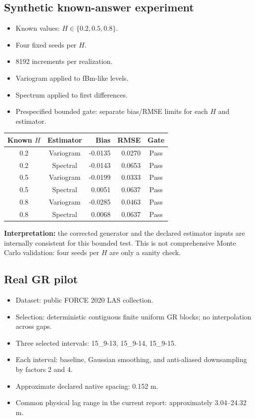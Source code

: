 \documentclass[11pt,a4paper]{article}
\begin{document}
\subsection{Synthetic known-answer experiment}
\begin{itemize}
\item Known values: $H\in\{0.2,0.5,0.8\}$.
\item Four fixed seeds per $H$.
\item 8192 increments per realization.
\item Variogram applied to fBm-like levels.
\item Spectrum applied to first differences.
\item Prespecified bounded gate: separate bias/RMSE limits for each $H$ and estimator.
\end{itemize}

\begin{center}
\begin{tabular}{@{}ccrrc@{}}
\toprule
Known $H$ & Estimator & Bias & RMSE & Gate\\
\midrule
0.2 & Variogram & -0.0135 & 0.0270 & Pass\\
0.2 & Spectral & -0.0143 & 0.0653 & Pass\\
0.5 & Variogram & -0.0199 & 0.0333 & Pass\\
0.5 & Spectral & 0.0051 & 0.0637 & Pass\\
0.8 & Variogram & -0.0285 & 0.0463 & Pass\\
0.8 & Spectral & 0.0068 & 0.0637 & Pass\\
\bottomrule
\end{tabular}
\end{center}

\textbf{Interpretation:} the corrected generator and the declared estimator inputs are internally consistent for this bounded test. This is not comprehensive Monte Carlo validation: four seeds per $H$ are only a sanity check.

\subsection{Real GR pilot}
\begin{itemize}
\item Dataset: public FORCE 2020 LAS collection.
\item Selection: deterministic contiguous finite uniform GR blocks; no interpolation across gaps.
\item Three selected intervals: 15\_9-13, 15\_9-14, 15\_9-15.
\item Each interval: baseline, Gaussian smoothing, and anti-aliased downsampling by factors 2 and 4.
\item Approximate declared native spacing: 0.152 m.
\item Common physical lag range in the current report: approximately 3.04--24.32 m.
\end{itemize}
\end{document}
